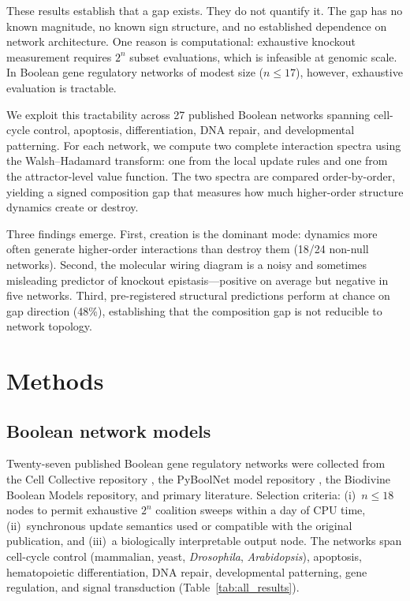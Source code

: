 \documentclass[11pt]{article}
\begin{document}
These results establish that a gap exists. They do not quantify it.
The gap has no known magnitude, no known sign structure, and no
established dependence on network architecture. One reason is
computational: exhaustive knockout measurement requires $2^n$ subset
evaluations, which is infeasible at genomic scale. In Boolean gene
regulatory networks of modest size ($n \leq 17$), however, exhaustive
evaluation is tractable.

We exploit this tractability across 27 published Boolean networks
spanning cell-cycle control, apoptosis, differentiation, DNA repair,
and developmental patterning. For each network, we compute two
complete interaction spectra using the Walsh--Hadamard transform: one
from the local update rules and one from the attractor-level value
function. The two spectra are compared order-by-order, yielding a
signed composition gap that measures how much higher-order structure
dynamics create or destroy.

Three findings emerge. First, creation is the dominant mode: dynamics
more often generate higher-order interactions than destroy them (18/24
non-null networks). Second, the molecular wiring diagram is a noisy
and sometimes misleading predictor of knockout epistasis---positive on
average but negative in five networks. Third, pre-registered
structural predictions perform at chance on gap direction (48\%),
establishing that the composition gap is not reducible to network
topology.


\section{Methods}
\label{sec:methods}

\subsection{Boolean network models}
\label{sec:models}

Twenty-seven published Boolean gene regulatory networks were collected
from the Cell Collective repository \citep{helikar2012cell}, the
PyBoolNet model repository \citep{klarner2017pyboolnet}, the Biodivine
Boolean Models repository, and primary literature. Selection criteria:
(i)~$n \leq 18$ nodes to permit exhaustive $2^n$ coalition sweeps
within a day of CPU time, (ii)~synchronous update semantics used or
compatible with the original publication, and (iii)~a biologically
interpretable output node. The networks span cell-cycle control
(mammalian, yeast, \emph{Drosophila}, \emph{Arabidopsis}), apoptosis,
hematopoietic differentiation, DNA repair, developmental patterning,
gene regulation, and signal transduction (Table~\ref{tab:all_results}).
\end{document}

